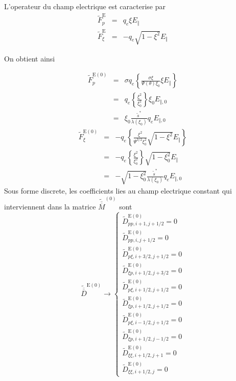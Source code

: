 L'operateur du champ electrique est caracterise par \begin{eqnarray*}
\widetilde{F}_{p}^{\text{E}} & = & q_{e}\xi E_{\Vert}\\
\widetilde{F}_{\xi}^{\text{E}} & = & -q_{e}\sqrt{1-\xi^{2}}E_{\Vert}\end{eqnarray*}


On obtient ainsi

\begin{eqnarray*}
\widetilde{F}_{p}^{\text{E}(0)} & = & \sigma q_{e}\left\{ \frac{\sigma\xi}{\Psi(\theta)\xi_{0}}\xi E_{\Vert}\right\} \\
 & = & q_{e}\left\{ \frac{\xi^{2}}{\xi_{0}^{2}}\right\} \xi_{0}E_{\Vert,0}\\
 & = & \xi_{0}\frac{\widetilde{s}^{*}}{\lambda\left(\xi_{0}\right)}q_{e}E_{\Vert,0}\end{eqnarray*}
\begin{eqnarray*}
\widetilde{F}_{\xi}^{\text{E}(0)} & = & -q_{e}\left\{ \frac{\xi^{2}}{\Psi^{3/2}\xi_{0}^{2}}\sqrt{1-\xi^{2}}E_{\Vert}\right\} \\
 & = & -q_{e}\left\{ \frac{\xi^{2}}{\xi_{0}^{2}}\right\} \sqrt{1-\xi_{0}^{2}}E_{\Vert}\\
 & = & -\sqrt{1-\xi_{0}^{2}}\frac{\widetilde{s}^{*}}{\lambda\left(\xi_{0}\right)}q_{e}E_{\Vert,0}\end{eqnarray*}
 Sous forme discrete, les coefficients lies au champ electrique constant
qui interviennent dans la matrice $\widetilde{\overline{\overline{M}}}^{\left(0\right)}$
sont \[
\widetilde{\overline{\overline{D}}}^{\text{E}(0)}\rightarrow\left\{ \begin{array}{l}
\widetilde{D}_{pp,i+1,j+1/2}^{\text{E}(0)}=0\\
\widetilde{D}_{pp,i,j+1/2}^{\text{E}(0)}=0\\
\widetilde{D}_{p\xi,i+3/2,j+1/2}^{\text{E}\left(0\right)}=0\\
\widetilde{D}_{\xi p,i+1/2,j+3/2}^{\text{E}\left(0\right)}=0\\
\widetilde{D}_{p\xi,i+1/2,j+1/2}^{\text{E}\left(0\right)}=0\\
\widetilde{D}_{\xi p,i+1/2,j+1/2}^{\text{E}\left(0\right)}=0\\
\widetilde{D}_{p\xi,i-1/2,j+1/2}^{\text{E}\left(0\right)}=0\\
\widetilde{D}_{\xi p,i+1/2,j-1/2}^{\text{E}\left(0\right)}=0\\
\widetilde{D}_{\xi\xi,i+1/2,j+1}^{\text{E}(0)}=0\\
\widetilde{D}_{\xi\xi,i+1/2,j}^{\text{E}(0)}=0\end{array}\right.\]
